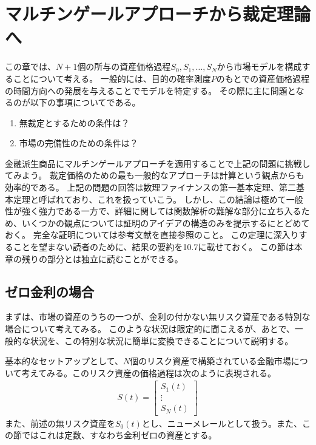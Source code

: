 \documentclass{jsbook}
\theoremstyle{withoutdotendstyle}
\numberwithin{theorem}{chapter}%
\begin{document}
\setcounter{chapter}{9}

\chapter{マルチンゲールアプローチから裁定理論へ}
この章では、$N+1$個の所与の資産価格過程$S_{0}, S_{1}, \dots, S_{N}$から市場モデルを構成することについて考える。
一般的には、目的の確率測度$P$のもとでの資産価格過程の時間方向への発展を与えることでモデルを特定する。
その際に主に問題となるのが以下の事項についてである。

\begin{enumerate}
  \item 無裁定とするための条件は？
  \item 市場の完備性のための条件は？
\end{enumerate}

金融派生商品にマルチンゲールアプローチを適用することで上記の問題に挑戦してみよう。
裁定価格のための最も一般的なアプローチは計算という観点からも効率的である。
上記の問題の回答は数理ファイナンスの第一基本定理、第二基本定理と呼ばれており、これを扱っていこう。
しかし、この結論は極めて一般性が強く強力である一方で、詳細に関しては関数解析の難解な部分に立ち入るため、いくつかの観点については証明のアイデアの構造のみを提示するにとどめておく。
完全な証明については参考文献を直接参照のこと。
この定理に深入りすることを望まない読者のために、結果の要約を10.7に載せておく。
この節は本章の残りの部分とは独立に読むことができる。

\section{ゼロ金利の場合}
まずは、市場の資産のうちの一つが、金利の付かない無リスク資産である特別な場合について考えてみる。
このような状況は限定的に聞こえるが、あとで、一般的な状況を、この特別な状況に簡単に変換できることについて説明する。

基本的なセットアップとして、$N$個のリスク資産で構築されている金融市場について考えてみる。このリスク資産の価格過程は次のように表現される。
\begin{align}
  S\left(t\right) = \left[
    \begin{array}{c}
      S_{1}\left(t\right)\\
      \vdots\\
      S_{N}\left(t\right)
    \end{array}
  \right]
\end{align}
また、前述の無リスク資産を$S_{0}\left(t\right)$とし、ニューメレールとして扱う。また、この節ではこれは定数、すなわち金利ゼロの資産とする。
\end{document}

